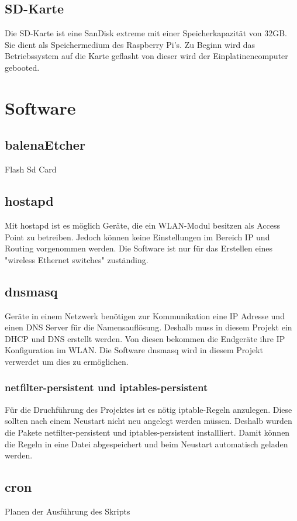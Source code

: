 \documentclass[a4paper,11pt,singlespacing]{article}
\begin{document}
			\subsection{SD-Karte}
    			Die SD-Karte ist eine SanDisk extreme mit einer Speicherkapazität von 32GB. Sie dient als Speichermedium des Raspberry Pi's. Zu Beginn wird das Betriebssystem auf die Karte geflasht von dieser wird der Einplatinencomputer gebooted.

    			
    	\section{Software}
    		\subsection{balenaEtcher}
    			Flash Sd Card
    		\subsection{hostapd}
        		Mit hostapd ist es möglich Geräte, die ein WLAN-Modul besitzen als Access Point zu betreiben. Jedoch können keine Einstellungen im Bereich IP und Routing vorgenommen werden. Die Software ist nur für das Erstellen eines "wireless Ethernet switches" zuständing. \cite{Quote_hostapd1} 
    		\subsection{dnsmasq}
        		Geräte in einem Netzwerk benötigen zur Kommunikation eine IP Adresse und einen DNS Server für die Namensauflösung. Deshalb muss in diesem Projekt ein DHCP und DNS erstellt werden. Von diesen bekommen die Endgeräte ihre IP Konfiguration im WLAN. Die Software dnsmasq wird in diesem Projekt verwerdet um dies zu ermöglichen.
    		\subsubsection{netfilter-persistent und iptables-persistent}
        		Für die Druchführung des Projektes ist es nötig iptable-Regeln anzulegen. Diese sollten nach einem Neustart nicht neu angelegt werden müssen. Deshalb wurden die Pakete netfilter-persistent und iptables-persistent installliert. Damit können die Regeln in eine Datei abgespeichert und beim Neustart automatisch geladen werden.
    		\subsection{cron}
			Planen der Ausführung des Skripts
\end{document}
